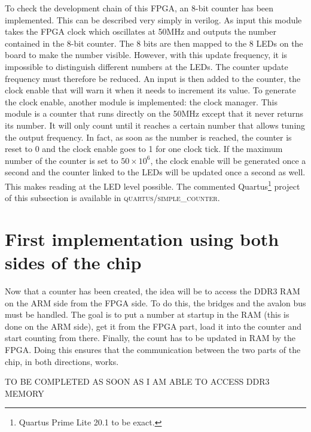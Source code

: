 \documentclass[12pt]{article}
\begin{document}
To check the development chain of this FPGA, an 8-bit counter has been implemented. This can be described very simply in verilog. As input this module takes the FPGA clock which oscillates at 50MHz and outputs the number contained in the 8-bit counter. The 8 bits are then mapped to the 8 LEDs on the board to make the number visible. However, with this update frequency, it is impossible to distinguish different numbers at the LEDs. The counter update frequency must therefore be reduced. An input is then added to the counter, the clock enable that will warn it when it needs to increment its value. To generate the clock enable, another module is implemented: the clock manager. This module is a counter that runs directly on the 50MHz except that it never returns its number. It will only count until it reaches a certain number that allows tuning the output frequency. In fact, as soon as the number is reached, the counter is reset to 0 and the clock enable goes to 1 for one clock tick. If the maximum number of the counter is set to $50 \times 10^6$, the clock enable will be generated once a second and the counter linked to the LEDs will be updated once a second as well. This makes reading at the LED level possible. The commented Quartus\footnote{Quartus Prime Lite 20.1 to be exact.} project of this subsection is available in \textsc{quartus/simple\_counter}.

\section{First implementation using both sides of the chip}

Now that a counter has been created, the idea will be to access the DDR3 RAM on the ARM side from the FPGA side. To do this, the bridges and the avalon bus must be handled. The goal is to put a number at startup in the RAM (this is done on the ARM side), get it from the FPGA part, load it into the counter and start counting from there. Finally, the count has to be updated in RAM by the FPGA. Doing this ensures that the communication between the two parts of the chip, in both directions, works.

\vspace{12pt}
TO BE COMPLETED AS SOON AS I AM ABLE TO ACCESS DDR3 MEMORY
\end{document}
